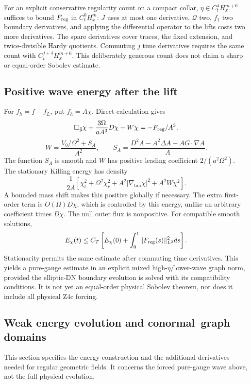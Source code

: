 For an explicit conservative regularity count on a compact collar, $\eta\in C_t^4H_x^{m+6}$ suffices to bound $F_{\rm reg}$ in $C_t^0H_x^m$: $J$ uses at most one derivative, $\mathcal Q$ two, $f_1$ two boundary derivatives, and applying the differential operator to the lifts costs two more derivatives. The spare derivatives cover traces, the fixed extension, and twice-divisible Hardy quotients. Commuting $j$ time derivatives requires the same count with $C_t^{j+4}H_x^{m+6}$. This deliberately generous count does not claim a sharp or equal-order Sobolev estimate.

\subsection{Positive wave energy after the lift}
For $f_h=f-f_L$, put $f_h=A\chi$. Direct calculation gives
\[
 \Box_{\bar g}\chi+\frac{3\Omega}{aA^3}D\chi-W\chi
 =-F_{\rm reg}/A^3,
\]
\[
 W=\frac{V_0/\Omega^2+S_A}{A^2},\qquad
 S_A=\frac{D^2A-A^2\Delta A-AG\cdot\nabla A}{A}.
\]
The function $S_A$ is smooth and $W$ has positive leading coefficient $2/(a^2\Omega^2)$. The stationary Killing energy has density
\[
 \frac1{2A}\left[\chi_t^2+\Omega^2\chi_r^2
 +A^2|\nabla_{\tan}\chi|^2+A^2W\chi^2\right].
\]
A bounded mass shift makes this positive globally if necessary. The extra first-order term is $O(\Omega)D\chi$, which is controlled by this energy, unlike an arbitrary coefficient times $D\chi$. The null outer flux is nonpositive. For compatible smooth solutions,
\[
 E_\chi(t)\le C_T\left[E_\chi(0)+\int_0^t\|F_{\rm reg}(s)\|_{L^2}^2ds\right].
\]
Stationarity permits the same estimate after commuting time derivatives. This yields a pure-gauge estimate in an explicit mixed high-$\eta$/lower-wave graph norm, provided the elliptic-DN boundary evolution is solved with its compatibility conditions. It is not yet an equal-order physical Sobolev theorem, nor does it include all physical Z4c forcing.
\subsection{Weak energy evolution and conormal--graph domains}
This section specifies the energy construction and the additional derivatives needed for regular geometric fields. It concerns the forced pure-gauge wave above, not the full physical evolution.

